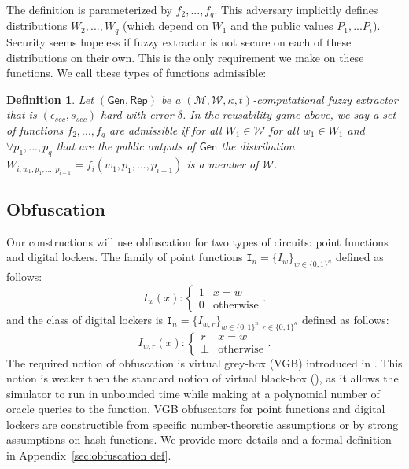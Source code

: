 \documentclass[11pt]{article}
\newcommand{\apref}[1]{\mbox{Appendix~\ref{#1}}}
\newcommand{\class}[1]{{\ensuremath{\mathsf{#1}}}}
\newcommand{\gen}{\ensuremath{\class{Gen}}\xspace}
\newcommand{\rep}{\ensuremath{\class{Rep}}\xspace}
\newcommand{\zo}{\ensuremath{\{0, 1\}}}
\newtheorem{definition}[theorem]{Definition}
\begin{document}
The definition is parameterized by $f_2,..., f_q$.  This adversary implicitly defines distributions $W_2,..., W_q$ (which depend on $W_1$ and the public values $P_1,... P_i$).  Security seems hopeless if fuzzy extractor is not secure on each of these distributions on their own.  This is the only requirement we make on these functions.  We call these types of functions admissible:

\begin{definition}
Let $(\gen, \rep)$ be a $(\mathcal{M}, \mathcal{W}, \kappa, t)$-computational fuzzy extractor that is $(\epsilon_{sec}, s_{sec})$-hard with error $\delta$.  In the reusability game above, we say a set of functions $f_2,..., f_q$ are \emph{admissible} if for all $W_1\in \mathcal{W}$ for all $w_1\in W_1$ and $\forall p_1,..., p_q$ that are the public outputs of $\gen$ the distribution $W_{i,w_1,p_1,..., p_{i-1}} = f_i(w_1,p_1,..., p_{i-1})$ is a member of $\mathcal{W}$.
\end{definition}

\subsection{Obfuscation}
Our constructions will use obfuscation for two types of circuits: point functions and digital lockers. The family of point functions $\mathtt{I}_n = \{I_w\}_{w \in \zo^n}$ defined as follows:
\[
I_w(x):\begin{cases} 1 & x=w\\0 & \text{otherwise}\end{cases}.
\]
and the class of digital lockers is $\mathtt{I}_n = \{I_{w, r}\}_{w \in \zo^n, r\in\zo^\kappa}$ defined as follows:
\[
I_{w, r}(x):\begin{cases} r & x=w\\\perp & \text{otherwise}\end{cases}.
\]
The required notion of obfuscation is virtual grey-box (VGB) introduced in \cite{bitansky2010strong}. This notion is weaker then the standard notion of virtual black-box (\cite{barak2001possibility}), as it allows the simulator to run in unbounded time while making at a polynomial number of oracle queries to the function. VGB obfuscators for point functions and digital lockers are constructible from specific number-theoretic assumptions or by strong assumptions on hash functions.  We provide more details and a formal definition in \apref{sec:obfuscation def}.
\end{document}
